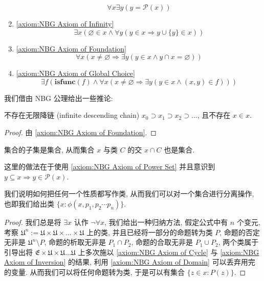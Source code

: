 \begin{enumerate}
    \[
        \forall x \exists y (y = \mathcal{P} (x))
    \]
    \item \ref{axiom:NBG Axiom of Infinity}
    \[
        \exists x (\varnothing \in x \land \forall y (y \in x \Rightarrow y \cup \{y\} \in x))
    \]
    \item \ref{axiom:NBG Axiom of Foundation}
    \[
        \forall x (x \neq \varnothing \Rightarrow \exists y (y \in x \land y \cap x = \varnothing))
    \]
    \item \ref{axiom:NBG Axiom of Global Choice}
    \[
        \exists f (\mathbf{isfunc} (f) \land \forall x (x \neq \varnothing \Rightarrow \exists y (y \in x \land (x,y) \in f)))
    \]
\end{enumerate}

我们借由 NBG 公理给出一些推论:

\begin{corollary}
    \label {corollary:no infinite descending chain}
    不存在无限降链 (infinite descending chain) \(x_0 \supset x_1 \supset x_2 \supset \dots\), 且不存在 \(x \in x\).

    \begin{proof}
        由 \ref{axiom:NBG Axiom of Foundation}.
    \end{proof}
\end{corollary}

\begin{corollary}
    \label {corollary:NBG every set can be separated by a class}
    集合的子集是集合, 从而集合 \(x\) 与类 \(C\) 的交 \(x \cap C\) 也是集合.

    这里的做法在于使用 \ref{axiom:NBG Axiom of Power Set} 并且意识到 \(y \subseteq x \Rightarrow y \in \mathcal{P} (x)\).
\end{corollary}

\begin{corollary}
    \label {corollary:NBG every property can be written as a class}
    我们说明如何把任何一个性质都写作类, 从而我们可以对一个集合进行分离操作, 也即我们给出类 \(\{x : \phi(x,p_1,p_2 \cdots p_n)\}\).

    \begin{proof}
        我们总是将 \(\exists x\) 认作 \(\neg \forall x\), 我们给出一种归纳方法,
        假定公式中有 \(n\) 个变元, 考察 \(\mathfrak{U}^n := \mathfrak{U} \times \mathfrak{U} \times \dots \times \mathfrak{U}\) 上的类,
        并且已经将一部分的命题转为类 \(P\), 命题的否定无非是 \(\mathfrak{U}^n \setminus P\), 命题的析取无非是 \(P_1 \cap P_2\),
        命题的合取无非是 \(P_1 \cup P_2\), 两个类属于引导出将 \(\mathfrak{E} \times \mathfrak{U} \times \mathfrak{U} \dots \mathfrak{U}\) 上多次施以
        \ref{axiom:NBG Axiom of Cycle} 与 \ref{axiom:NBG Axiom of Inversion} 的结果, 利用 \ref{axiom:NBG Axiom of Domain} 可以丢弃用完的变量.
        从而我们可以将任何命题转为类, 于是可以有集合 \(\{z \in x : P(z)\}\).
    \end{proof}
\end{corollary}

